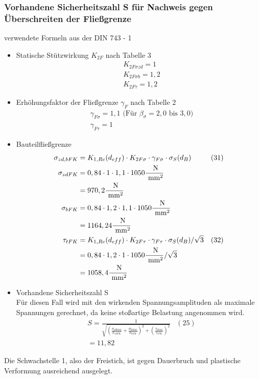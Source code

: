 \subsubsection{Vorhandene Sicherheitszahl S für Nachweis gegen Überschreiten der Fließgrenze}
verwendete Formeln aus der DIN 743 - 1
\begin{itemize}
\item Statische Stützwirkung $K_{2F}$ nach Tabelle 3
	\begin{align*}
	&K_{2F \sigma zd} = 1 \\
	&K_{2F \sigma b} = 1,2 \\
	&K_{2F \tau} = 1,2 
	\end{align*}
\item Erhöhungsfaktor der Fließgrenze $\gamma_{F}$ nach Tabelle 2
	\begin{align*}
	&\gamma_{F\sigma} = 1,1 \text{ (Für } \beta_{\sigma} = 2,0 \text{ bis } 3,0 \text{)} \\
	&\gamma_{F\tau} = 1 
	\end{align*}
\item Bauteilfließgrenze
	\begin{align*}
	\sigma_{zd,bFK} &= K_{1,Re} (d_{eff}) \cdot K_{2F \sigma} \cdot \gamma_{F\sigma} \cdot \sigma_S (d_B) & (31) \\
	\sigma_{zdFK}&= 0,84 \cdot 1 \cdot 1,1 \cdot 1050 \frac{\text{ N}}{\text{ mm}^2} \\
	&= 970,2 \frac{\text{ N}}{\text{ mm}^2}\\
	\sigma_{bFK}&= 0,84 \cdot 1,2 \cdot 1,1 \cdot 1050 \frac{\text{ N}}{\text{ mm}^2} \\
	&= 1164,24\frac{\text{ N}}{\text{ mm}^2}\\
	\tau_{tFK} &= K_{1,Re} (d_{eff}) \cdot K_{2F \tau} \cdot \gamma_{F\tau} \cdot \sigma_S (d_B) / \sqrt{3} &(32) \\
	&= 0,84 \cdot 1,2 \cdot 1 \cdot 1050 \frac{\text{ N}}{\text{ mm}^2} / \sqrt{3}\\
	&= 1058,4 \frac{\text{ N}}{\text{ mm}^2}
	\end{align*}
\newpage
\item Vorhandene Sicherheitszahl S \\
	Für diesen Fall wird mit den wirkenden Spannungsamplituden als maximale Spannungen gerechnet, da keine stoßartige Belastung angenommen wird. 
	\begin{align*}
	&S = \frac{1}{\sqrt{\left( \frac{\sigma_{zdmax}}{\sigma_{zdFK}}+\frac{\sigma_{bmax}}{\sigma_{bFK}} \right)^2 +\left( \frac{\tau_{tmax}}{\tau_{tFK}} \right)^2 }} & (25)\\
	&= 11,82
	\end{align*}
\end{itemize}
Die Schwachstelle 1, also der Freistich, ist gegen Dauerbruch und plastische Verformung ausreichend ausgelegt.


